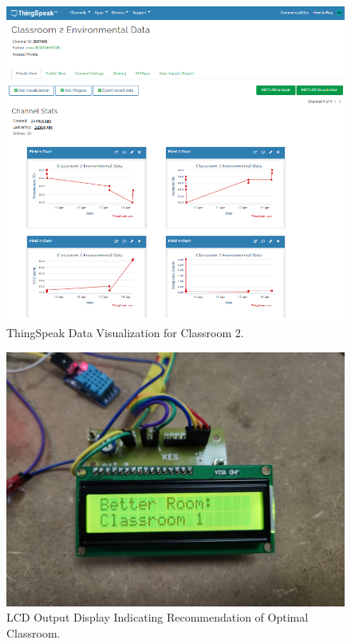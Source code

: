 \begin{figure}[t]
  \centering
  \includegraphics[width=\columnwidth]{figures/cls2.png} %
  \caption{ThingSpeak Data Visualization for Classroom 2.}
  \label{fig:thingspeak_cls2}
\end{figure}

\begin{figure}[t]
  \centering
  \includegraphics[width=0.8\columnwidth]{figures/lcd.jpeg} %
  \caption{LCD Output Display Indicating Recommendation of Optimal Classroom.}
  \label{fig:lcd_output}
\end{figure}

